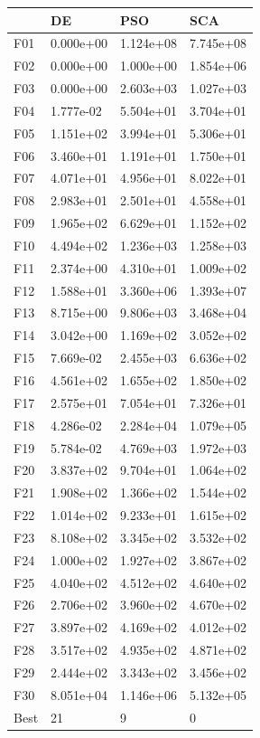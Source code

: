 \begin{tabular}{llll}
\toprule
{} &         DE &        PSO &        SCA \\
\midrule
F01  &  0.000e+00 &  1.124e+08 &  7.745e+08 \\
F02  &  0.000e+00 &  1.000e+00 &  1.854e+06 \\
F03  &  0.000e+00 &  2.603e+03 &  1.027e+03 \\
F04  &  1.777e-02 &  5.504e+01 &  3.704e+01 \\
F05  &  1.151e+02 &  3.994e+01 &  5.306e+01 \\
F06  &  3.460e+01 &  1.191e+01 &  1.750e+01 \\
F07  &  4.071e+01 &  4.956e+01 &  8.022e+01 \\
F08  &  2.983e+01 &  2.501e+01 &  4.558e+01 \\
F09  &  1.965e+02 &  6.629e+01 &  1.152e+02 \\
F10  &  4.494e+02 &  1.236e+03 &  1.258e+03 \\
F11  &  2.374e+00 &  4.310e+01 &  1.009e+02 \\
F12  &  1.588e+01 &  3.360e+06 &  1.393e+07 \\
F13  &  8.715e+00 &  9.806e+03 &  3.468e+04 \\
F14  &  3.042e+00 &  1.169e+02 &  3.052e+02 \\
F15  &  7.669e-02 &  2.455e+03 &  6.636e+02 \\
F16  &  4.561e+02 &  1.655e+02 &  1.850e+02 \\
F17  &  2.575e+01 &  7.054e+01 &  7.326e+01 \\
F18  &  4.286e-02 &  2.284e+04 &  1.079e+05 \\
F19  &  5.784e-02 &  4.769e+03 &  1.972e+03 \\
F20  &  3.837e+02 &  9.704e+01 &  1.064e+02 \\
F21  &  1.908e+02 &  1.366e+02 &  1.544e+02 \\
F22  &  1.014e+02 &  9.233e+01 &  1.615e+02 \\
F23  &  8.108e+02 &  3.345e+02 &  3.532e+02 \\
F24  &  1.000e+02 &  1.927e+02 &  3.867e+02 \\
F25  &  4.040e+02 &  4.512e+02 &  4.640e+02 \\
F26  &  2.706e+02 &  3.960e+02 &  4.670e+02 \\
F27  &  3.897e+02 &  4.169e+02 &  4.012e+02 \\
F28  &  3.517e+02 &  4.935e+02 &  4.871e+02 \\
F29  &  2.444e+02 &  3.343e+02 &  3.456e+02 \\
F30  &  8.051e+04 &  1.146e+06 &  5.132e+05 \\
Best &         21 &          9 &          0 \\
\bottomrule
\end{tabular}
